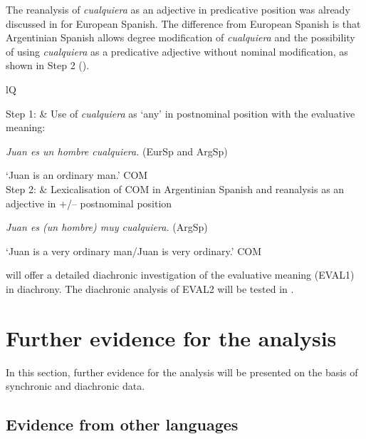 The reanalysis of \textit{cualquiera} as an adjective in predicative position was already discussed in  for European Spanish. The difference from European Spanish is that Argentinian Spanish allows degree modification of \textit{cualquiera} and the possibility of using \textit{cualquiera} as a predicative adjective without nominal modification, as shown in Step 2 ().

\begin{table}
\begin{tabularx}{\textwidth}{lQ}
\lsptoprule

Step 1: & Use of \textit{cualquiera} as ‘any’ in postnominal position with the evaluative meaning:

 \textit{Juan es un hombre cualquiera.} (EurSp and ArgSp)

‘Juan is an ordinary man.’ COM\\
\tablevspace
Step 2: & Lexicalisation of COM in Argentinian Spanish and reanalysis as an adjective in +/– postnominal position

\textit{Juan es (un hombre) muy cualquiera.} (ArgSp)

‘Juan is a very ordinary man/Juan is very ordinary.’ COM\\
\lspbottomrule
\end{tabularx}
\caption{{Diachronic} {steps} {of} predicative {cualquiera}}
\label{tab:key:diachronic}
\end{table}

 will offer a detailed diachronic investigation of the evaluative meaning (EVAL1) in diachrony. The diachronic analysis of EVAL2 will be tested in .

\section{{Further} {evidence} {for} {the} {analysis}} \label{sec:4.6}

In this section, further evidence for the analysis will be presented on the basis of synchronic and diachronic data.

\subsection{{Evidence} {from} {other} {languages}} \label{sec:4.6.1}

